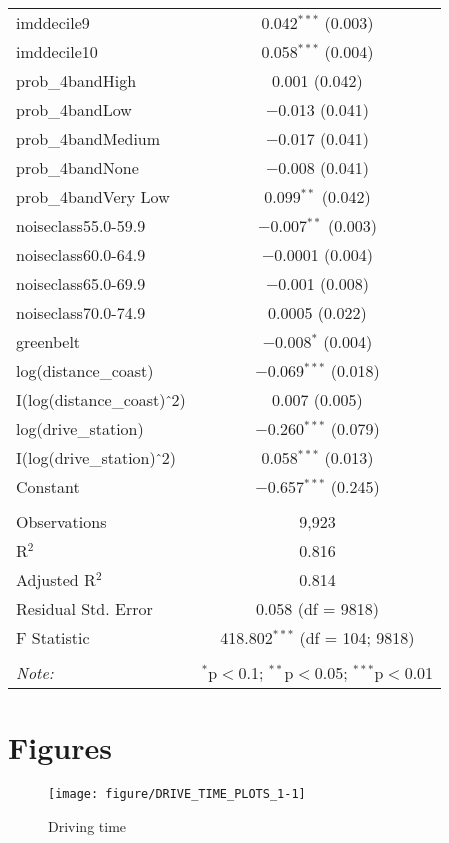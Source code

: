 \documentclass{article}\usepackage[]{graphicx}\usepackage[]{color}
\newenvironment{knitrout}{}{} %
\begin{document}
\begin{table}[!htbp]
\begin{tabular}{@{\extracolsep{5pt}}lc}
  imddecile9 & 0.042$^{***}$ (0.003) \\ 
  imddecile10 & 0.058$^{***}$ (0.004) \\ 
  prob\_4bandHigh & 0.001 (0.042) \\ 
  prob\_4bandLow & $-$0.013 (0.041) \\ 
  prob\_4bandMedium & $-$0.017 (0.041) \\ 
  prob\_4bandNone & $-$0.008 (0.041) \\ 
  prob\_4bandVery Low & 0.099$^{**}$ (0.042) \\ 
  noiseclass55.0-59.9 & $-$0.007$^{**}$ (0.003) \\ 
  noiseclass60.0-64.9 & $-$0.0001 (0.004) \\ 
  noiseclass65.0-69.9 & $-$0.001 (0.008) \\ 
  noiseclass70.0-74.9 & 0.0005 (0.022) \\ 
  greenbelt & $-$0.008$^{*}$ (0.004) \\ 
  log(distance\_coast) & $-$0.069$^{***}$ (0.018) \\ 
  I(log(distance\_coast)$\hat{\mkern6mu}$2) & 0.007 (0.005) \\ 
  log(drive\_station) & $-$0.260$^{***}$ (0.079) \\ 
  I(log(drive\_station)$\hat{\mkern6mu}$2) & 0.058$^{***}$ (0.013) \\ 
  Constant & $-$0.657$^{***}$ (0.245) \\ 
 \hline \\[-1.8ex] 
Observations & 9,923 \\ 
R$^{2}$ & 0.816 \\ 
Adjusted R$^{2}$ & 0.814 \\ 
Residual Std. Error & 0.058 (df = 9818) \\ 
F Statistic & 418.802$^{***}$ (df = 104; 9818) \\ 
\hline 
\hline \\[-1.8ex] 
\textit{Note:}  & \multicolumn{1}{r}{$^{*}$p$<$0.1; $^{**}$p$<$0.05; $^{***}$p$<$0.01} \\ 
\end{tabular} 
\end{table} 

\pagebreak
\section{Figures}


\begin{knitrout}\scriptsize
{}\color{fgcolor}\begin{figure}
\texttt{[image: figure/DRIVE\_TIME\_PLOTS\_1-1]} \caption[Driving time]{Driving time}\label{fig:DRIVE_TIME_PLOTS_1}
\end{figure}


\end{knitrout}
\end{document}
